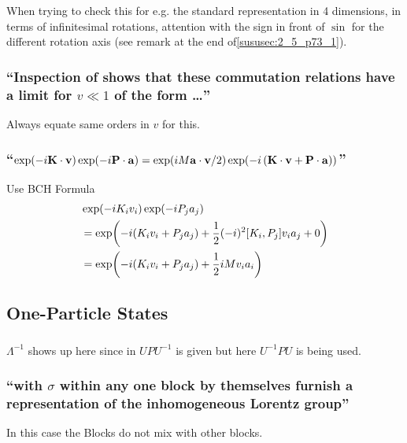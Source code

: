 \subsubsection{ }
When trying to check this for e.g. the standard representation in 4 dimensions, in terms of infinitesimal rotations, attention with the sign in front of $\sin$ for the different rotation axis (see remark at the end of\ref{sususec:2_5_p73_1}).

\subsubsection{\enquote{Inspection of  shows that these commutation relations have a limit for $v\ll1$ of the form \dots} }
Always equate same orders in $v$ for this.

\subsubsection{\enquote{$\exp(-i \mathbf{K}\cdot\mathbf{v})\exp(-i \mathbf{P}\cdot\mathbf{a})=\exp(i M\mathbf{a}\cdot\mathbf{v}/2)\exp(-i \left(\mathbf{K}\cdot\mathbf{v}+\mathbf{P}\cdot\mathbf{a}\right))$} }
Use BCH Formula
\begin{align*} 
	&\exp(-i K_i v_i)\exp(-i P_j a_j)\\
	&=\exp(-i(K_i v_i+P_j a_j)+\dfrac{1}{2}(-i)^2\commutator{K_i}{P_j}v_ia_j+0)\\
	&=\exp(-i(K_i v_i+P_j a_j)+\dfrac{1}{2}iM v_i a_i)
\end{align*}

\subsection{One-Particle States}\label{susec:2_5}
\subsubsection{ }
$\Lambda^{-1}$ shows up here since in  $U P U^{-1}$ is given but here $U^{-1} P U$ is being used.

\subsubsection{\enquote{with $\sigma$ within any one block by themselves furnish a representation of the inhomogeneous Lorentz group} }
In this case the Blocks do not mix with other blocks.

